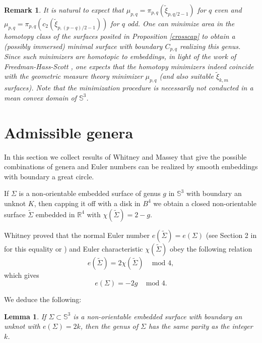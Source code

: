 \documentclass[11pt, reqno]{amsart}
\newtheorem{lemma}[thm]{Lemma}
\newtheorem{rmk}[thm]{Remark}
\numberwithin{equation}{section}
\begin{document}
\begin{rmk}\label{coincide}
It is natural to expect that $\mu_{p,q}=\pi_{p,q}(\tilde{\xi}_{p,q/2-1})$ for $q$ even and $\mu_{p,q}=\pi_{p,q}(c_2(\tilde{\xi}_{p,(p-q)/2-1}))$ for $q$ odd.  One can minimize area in the homotopy class of the surfaces posited in Proposition \ref{crosscap} to obtain a (possibly immersed) minimal surface with boundary $C_{p,q}$ realizing this genus. Since such minimizers are homotopic to embeddings, in light of the work of Freedman-Hass-Scott \cite{FHS}, one expects that the homotopy minimizers indeed coincide with the geometric measure theory minimizer $\mu_{p,q}$ (and also suitable $\tilde{\xi}_{k,m}$ surfaces).  Note that the minimization procedure is necessarily not conducted in a mean convex domain of $\mathbb{S}^3$.
\end{rmk}



\section{Admissible genera}\label{admissiblesection}
In this section we collect results of Whitney and Massey that give the possible combinations of genera and Euler numbers can be realized by smooth embeddings with boundary a great circle. 

If $\Sigma$ is a non-orientable embedded surface of genus $g$ in $\mathbb{S}^3$ with boundary an unknot $K$, then capping it off with a disk in $B^4$ we obtain a closed non-orientable surface $\tilde{\Sigma}$ embedded in $\mathbb{R}^4$ with  $\chi(\tilde{\Sigma})=2-g$.  

Whitney \cite{Whitney} proved that the normal Euler number $e(\tilde{\Sigma})=e(\Sigma)$ (see Section 2 in \cite{Conway} for this equality or \cite[1.1.1]{Yasuhara}) and Euler characteristic $\chi(\tilde{\Sigma})$ obey the following relation 
\begin{equation}
e(\tilde{\Sigma})=2\chi(\tilde{\Sigma}) \;\;\;\mbox{   mod } 4, 
\end{equation}
which gives
\begin{equation}
e(\Sigma)=-2g \;\;\;\mbox{   mod } 4.
\end{equation}


We deduce the following:

\begin{lemma}\label{parity}
If $\Sigma\subset \mathbb{S}^3$ is a non-orientable embedded surface with boundary an unknot with $e(\Sigma)=2k$, then the genus of $\Sigma$ has the same parity as the integer $k$.
\end{lemma}
\end{document}
